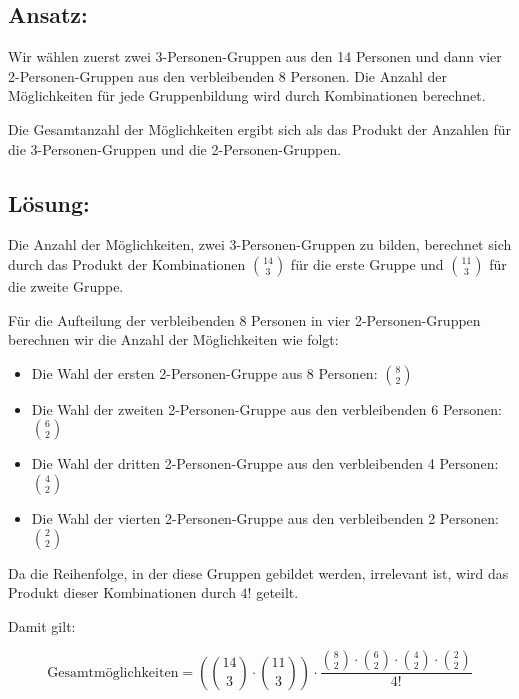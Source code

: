 \documentclass{article}
\begin{document}
\subsection*{Ansatz:}
Wir wählen zuerst zwei 3-Personen-Gruppen aus den 14 Personen und dann vier 2-Personen-Gruppen aus den verbleibenden 8 Personen. Die Anzahl der Möglichkeiten für jede Gruppenbildung wird durch Kombinationen berechnet.

Die Gesamtanzahl der Möglichkeiten ergibt sich als das Produkt der Anzahlen für die 3-Personen-Gruppen und die 2-Personen-Gruppen.

\subsection*{Lösung:}
Die Anzahl der Möglichkeiten, zwei 3-Personen-Gruppen zu bilden, berechnet sich durch das Produkt der Kombinationen \(\binom{14}{3}\) für die erste Gruppe und \(\binom{11}{3}\) für die zweite Gruppe.

Für die Aufteilung der verbleibenden 8 Personen in vier 2-Personen-Gruppen berechnen wir die Anzahl der Möglichkeiten wie folgt:
\begin{itemize}
	\item Die Wahl der ersten 2-Personen-Gruppe aus 8 Personen: \(\binom{8}{2}\)
	\item Die Wahl der zweiten 2-Personen-Gruppe aus den verbleibenden 6 Personen: \(\binom{6}{2}\)
	\item Die Wahl der dritten 2-Personen-Gruppe aus den verbleibenden 4 Personen: \(\binom{4}{2}\)
	\item Die Wahl der vierten 2-Personen-Gruppe aus den verbleibenden 2 Personen: \(\binom{2}{2}\)
\end{itemize}

Da die Reihenfolge, in der diese Gruppen gebildet werden, irrelevant ist, wird das Produkt dieser Kombinationen durch \(4!\) geteilt.

Damit gilt:

\[
	\text{Gesamtmöglichkeiten} = \left(\binom{14}{3} \cdot \binom{11}{3}\right) \cdot \frac{\binom{8}{2} \cdot \binom{6}{2} \cdot \binom{4}{2} \cdot \binom{2}{2}}{4!}
\]
\end{document}
